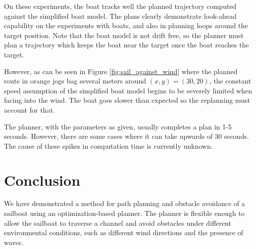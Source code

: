 \documentclass[conference]{IEEEtran}
\newcommand{\Sim}{\lstinline{stda-sailboat-simulator}\ }
\begin{document}
On these experiments, the boat tracks well the planned trajectory computed against the simplified boat model. The plans clearly demonstrate look-ahead capability on the experiments with boats, and also in planning loops around the target position. Note that the boat model is not drift free, so the planner must plan a trajectory which keeps the boat near the target once the boat reaches the target.

However, as can be seen in Figure \ref{fig:sail_against_wind} where the planned route in orange jogs bag several meters around \((x,y) = (30,20)\), the constant speed assumption of the simplified boat model begins to be severely limited when facing into the wind. The boat goes slower than expected so the replanning must account for that.  

The planner, with the parameters as given, usually completes a plan in 1-5 seconds. However, there are some cases where it can take upwards of 30 seconds. The cause of these spikes in computation time is currently unknown.


\section{Conclusion}
We have demonstrated a method for path planning and obstacle avoidance of a sailboat using an optimization-based planner. The planner is flexible enough to allow the sailboat to traverse a channel and avoid obstacles under different environmental conditions, such as different wind directions and the presence of waves.



\end{document}
